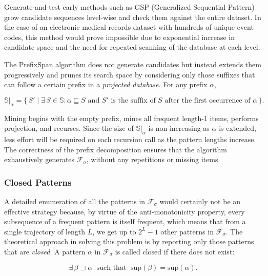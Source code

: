 Generate-and-test early methods such as GSP (Generalized Sequential Pattern) grow candidate sequences level-wise and check them against the entire dataset. In the case of an electronic medical records dataset with hundreds of unique event codes, this method would prove impossible due to exponential increase in candidate space and the need for repeated scanning of the database at each level.

The PrefixSpan algorithm \cite{pei2001} does not generate candidates but instead extends them progressively and prunes its search space by considering only those suffixes that can follow a certain prefix in a \emph{projected database}. For any prefix $\alpha$,

\begin{equation}
    \mathbb{S}|_\alpha = \bigl\{\, S' \mid \exists\, S \in \mathbb{S}: \alpha \sqsubseteq S \text{ and } S' \text{ is the suffix of } S \text{ after the first occurrence of } \alpha \,\bigr\}.
    \label{eq:projection}
\end{equation}

Mining begins with the empty prefix, mines all frequent length-1 items, performs projection, and recurses. Since the size of $\mathbb{S}|_\alpha$ is non-increasing as $\alpha$ is extended, less effort will be required on each recursion call as the pattern lengths increase. The correctness of the prefix decomposition ensures that the algorithm exhaustively generates $\mathcal{F}_\sigma$, without any repetitions or missing items.

\subsubsection*{Closed Patterns}

A detailed enumeration of all the patterns in $\mathcal{F}_\sigma$ would certainly not be an effective strategy because, by virtue of the anti-monotonicity property, every subsequence of a frequent pattern is itself frequent, which means that from a single trajectory of length $L$, we get up to $2^L-1$ other patterns in $\mathcal{F}_\sigma$. The theoretical approach in solving this problem is by reporting only those patterns that are \emph{closed}. A pattern $\alpha$ in $\mathcal{F}_\sigma$ is called closed if there does not exist:

\begin{equation}
    \exists\, \beta \sqsupset \alpha \;\text{ such that }\; \mathrm{sup}(\beta) = \mathrm{sup}(\alpha).
    \label{eq:closed}
\end{equation}

